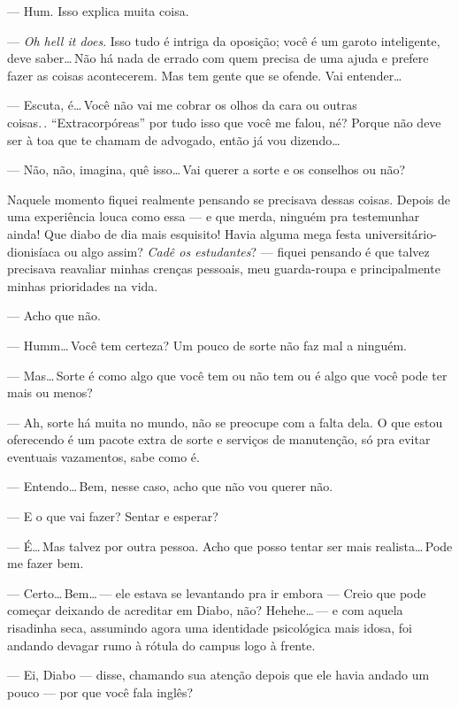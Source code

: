 --- Hum. Isso explica muita coisa.

--- \emph{Oh hell it does}. Isso tudo é intriga da oposição; você é um garoto inteligente, deve saber\ldots\,Não há nada de errado com quem precisa de uma ajuda e prefere fazer as coisas acontecerem. Mas tem gente que se ofende. Vai entender\ldots

--- Escuta, é\ldots\,Você não vai me cobrar os olhos da cara ou outras coisas.\,.\,\,``Extracorpóreas'' por tudo isso que você me falou, né? Porque não deve ser à toa que te chamam de advogado, então já vou dizendo\ldots

--- Não, não, imagina, quê isso\ldots\,Vai querer a sorte e os conselhos ou não?

Naquele momento fiquei realmente pensando se precisava dessas coisas. Depois de uma experiência louca como essa --- e que merda, ninguém pra testemunhar ainda! Que diabo de dia mais esquisito! Havia alguma mega festa u\-ni\-ver\-si\-tá\-ri\-o-dio\-ni\-sí\-a\-ca ou algo assim? \emph{Cadê os estudantes}? --- fiquei pensando é que talvez precisava reavaliar minhas crenças pessoais, meu guarda-roupa e principalmente minhas prioridades na vida.

--- Acho que não.

--- Humm\ldots\,Você tem certeza? Um pouco de sorte não faz mal a ninguém.

--- Mas\ldots\,Sorte é como algo que você tem ou não tem ou é algo que você pode ter mais ou menos?

--- Ah, sorte há muita no mundo, não se preocupe com a falta dela. O que estou oferecendo é um pacote extra de sorte e serviços de manutenção, só pra evitar eventuais vazamentos, sabe como é.

--- Entendo\ldots\,Bem, nesse caso, acho que não vou querer não.

--- E o que vai fazer? Sentar e esperar?

--- É\ldots\,Mas talvez por outra pessoa. Acho que posso tentar ser mais realista\ldots\,Pode me fazer bem.

--- Certo\ldots\,Bem\ldots\,--- ele estava se levantando pra ir embora --- Creio que pode começar deixando de acreditar em Diabo, não? Hehehe\ldots\,--- e com aquela risadinha seca, assumindo agora uma identidade psicológica mais idosa, foi andando devagar rumo à rótula do campus logo à frente.

--- Ei, Diabo --- disse, chamando sua atenção depois que ele havia andado um pouco --- por que você fala inglês?

